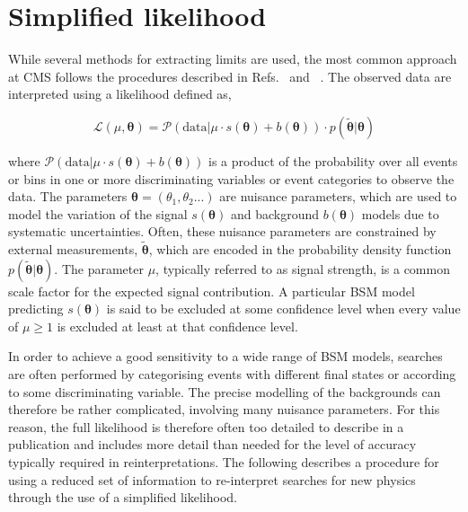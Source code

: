 \section{Simplified likelihood}
\label{sec:simplified-likelihood}

While several methods for extracting 
limits are used, the most common approach at CMS follows the procedures  
described in Refs.~\cite{Chatrchyan:2012tx} and ~\cite{CMS-NOTE-2011-005}. 
The observed data are interpreted using a likelihood defined as,

\begin{equation}
 \mathcal{L}(\mu, \boldsymbol{\theta}) = 
 \mathcal{P}(\mathrm{data}|\mu\cdot s(\boldsymbol{\theta}) + b(\boldsymbol{\theta})) \cdot p(\tilde{\boldsymbol{\theta}}|\boldsymbol{\theta})
\label{eq:generic-likelihood}
\end{equation}

where $\mathcal{P}(\mathrm{data}|\mu\cdot s(\boldsymbol{\theta}) + b(\boldsymbol{\theta}))$ is a product of the probability 
over all events or bins in one or more discriminating variables or event categories to observe the data. The parameters 
$\boldsymbol{\theta}=\left(\theta_{1},\theta_{2}...\right)$ are nuisance parameters, which are used to model the variation of the 
signal $s(\boldsymbol{\theta})$ and background $b(\boldsymbol{\theta})$ models due to systematic uncertainties. Often, these nuisance 
parameters are constrained by external measurements, $\tilde{\boldsymbol{\theta}}$, which are encoded in the 
probability density function $p(\tilde{\boldsymbol{\theta}}|\boldsymbol{\theta})$. 
The parameter $\mu$, typically referred to as signal strength, is a common scale factor for the expected signal contribution. 
A particular BSM model predicting $s(\boldsymbol{\theta})$ is said to be excluded at some confidence level 
when every value of $\mu\ge1$ is excluded at least at that confidence level.

In order to achieve a good sensitivity to a wide range of BSM models, searches are often performed 
by categorising events with different final states or according to some discriminating variable. 
The precise modelling of the backgrounds can therefore be rather complicated, involving many 
nuisance parameters. For this reason, the full likelihood is therefore often 
too detailed to describe in a publication and includes more detail than needed for the level of accuracy
typically required in reinterpretations.
The following describes a procedure for using a reduced set of information to 
re-interpret searches for new physics through the use of a simplified likelihood. 


